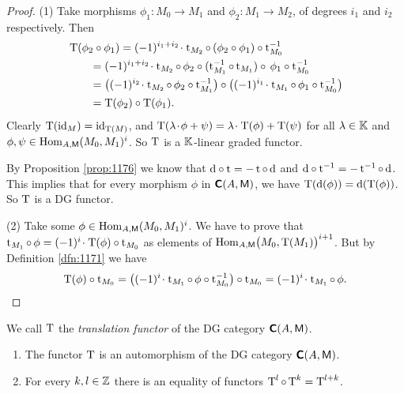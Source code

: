 \begin{proof} \mbox{}

\smallskip \noindent
(1) Take morphisms
$\phi_1 : M_0 \to M_1$ and $\phi_2 : M_1 \to M_2$, of degrees $i_1$ and $i_2$ 
respectively. Then 
\[ \begin{aligned}
& \operatorname{T}(\phi_2 \circ \phi_1) = 
(-1)^{i_1 + i_2} \mspace{1.5mu}{\cdot}\mspace{1.5mu} \operatorname{t}_{M_2} \circ \, (\phi_2 \circ \phi_1) \circ 
\operatorname{t}_{M_0}^{-1}
\\ 
& \qquad  = (-1)^{i_1 + i_2} \mspace{1.5mu}{\cdot}\mspace{1.5mu} \operatorname{t}_{M_2} \circ \, \phi_2 \circ 
(\operatorname{t}_{M_1}^{-1} \circ \operatorname{t}_{M_1}) \circ \, \phi_1 \circ  
\operatorname{t}_{M_0}^{-1} 
\\ 
& \qquad = \bigl( (-1)^{i_2} \mspace{1.5mu}{\cdot}\mspace{1.5mu} \operatorname{t}_{M_2} \circ \, \phi_2 \circ 
\operatorname{t}_{M_1}^{-1}\bigr) \circ 
\bigl( (-1)^{i_1} \mspace{1.5mu}{\cdot}\mspace{1.5mu}  \operatorname{t}_{M_1} \circ \, \phi_1 \circ \operatorname{t}_{M_0}^{-1} 
\bigr)
\\ 
& \qquad =
\operatorname{T}(\phi_2) \circ \operatorname{T}(\phi_1) . 
\end{aligned} \]
Clearly $\operatorname{T}(\operatorname{id}_{M}) = \operatorname{id}_{\operatorname{T}(M)}$, and 
$\operatorname{T}(\lambda \mspace{1.5mu}{\cdot}\mspace{1.5mu} \phi + \psi) = \lambda \mspace{1.5mu}{\cdot}\mspace{1.5mu} \operatorname{T}(\phi) + \operatorname{T}(\psi)$
for all $\lambda \in \mathbb{K}$ and 
$\phi, \psi \in \operatorname{Hom}_{A, \operatorname{\mathsf{M}}} (M_0, M_1)^{i}$. 
So $\operatorname{T}$ is a $\mathbb{K}$-linear graded functor. 

By Proposition \ref{prop:1176} we know that 
$\mathrm{d} \circ \operatorname{t} = - \operatorname{t} \circ \, \mathrm{d}$
and 
$\mathrm{d} \circ \operatorname{t}^{-1} = - \operatorname{t}^{-1} \circ \, \mathrm{d}$.
This implies that for every morphism 
$\phi$ in $\boldsymbol{\mathsf{C}}(A, \operatorname{\mathsf{M}})$, we have 
$\operatorname{T}(\mathrm{d}(\phi)) = \mathrm{d}(\operatorname{T}(\phi))$.
So $\operatorname{T}$ is a DG functor. 

\medskip \noindent
(2) Take some $\phi \in \operatorname{Hom}_{A, \operatorname{\mathsf{M}}} (M_0, M_1)^{i}$. 
We have to prove that 
$\opn{t}_{M_1} \circ \, \phi = \lb (-1)^{i} \cd \opn{T}(\phi) \circ 
\opn{t}_{M_0}$ 
as elements of 
$\operatorname{Hom}_{A, \operatorname{\mathsf{M}}} \bigl( M_0, \operatorname{T}(M_1) \bigr)^{i + 1}$.
But by Definition \ref{dfn:1171} we have 
\[ \operatorname{T}(\phi) \circ \operatorname{t}_{M_0} = 
\bigl( (-1)^{i} \mspace{1.5mu}{\cdot}\mspace{1.5mu} \operatorname{t}_{M_1} \circ \, \phi \circ \operatorname{t}_{M_0}^{-1} \bigr) 
\circ \operatorname{t}_{M_0} =  (-1)^{i} \mspace{1.5mu}{\cdot}\mspace{1.5mu} \operatorname{t}_{M_1} \circ \, \phi . \qedhere \]
\end{proof}

\begin{dfn} \label{dfn:1275}
We call $\operatorname{T}$ the {\em translation functor} of the DG category 
$\boldsymbol{\mathsf{C}}(A, \operatorname{\mathsf{M}})$.  
\end{dfn}

\begin{cor} \label{cor:1300} \mbox{}
\begin{enumerate}
\item The functor $\operatorname{T}$ is an automorphism of the DG category 
$\boldsymbol{\mathsf{C}}(A, \operatorname{\mathsf{M}})$.

\item For every $k, l \in \mathbb{Z}$ there is an equality of functors
$\operatorname{T}^{l} \circ \operatorname{T}^{k} = \operatorname{T}^{l + k}$.
\end{enumerate}
\end{cor}

